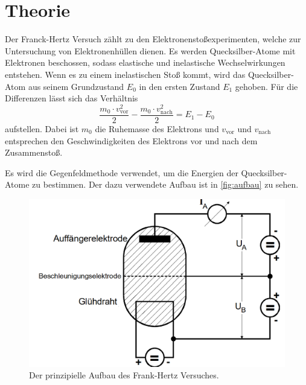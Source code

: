 \section{Theorie}
\label{sec:theorie}

Der Franck-Hertz Versuch zählt zu den Elektronenstoßexperimenten, welche zur Untersuchung von Elektronenhüllen dienen.
Es werden Quecksilber-Atome mit Elektronen beschossen, sodass elastische und inelastische Wechselwirkungen entstehen.
Wenn es zu einem inelastischen Stoß kommt, wird das Quecksilber-Atom aus seinem Grundzustand $E_0$ in den 
ersten Zustand $E_1$ gehoben. Für die Differenzen lässt sich das Verhältnis 
\begin{equation}
    \frac{m_0 \cdot v_{\text{vor}}^2}{2} - \frac{m_0 \cdot v_{\text{nach}}^2}{2} = E_1 - E_0
    \label{eqn:diff}
\end{equation}
aufstellen. Dabei ist $m_0$ die Ruhemasse des Elektrons und $v_{\text{vor}}$ und $v_{\text{nach}}$ entsprechen den Geschwindigkeiten
des Elektrons vor und nach dem Zusammenstoß.

Es wird die Gegenfeldmethode verwendet, um die Energien der Quecksilber-Atome zu bestimmen. 
Der dazu verwendete Aufbau ist in \autoref{fig:aufbau} zu sehen.

\begin{figure}[H]
	\centering
	\includegraphics[width=0.75\linewidth]{content/grafik/aufbau.png}
	\caption{Der prinzipielle Aufbau des Frank-Hertz Versuches. \cite{franck}}
	\label{fig:aufbau}
\end{figure}


